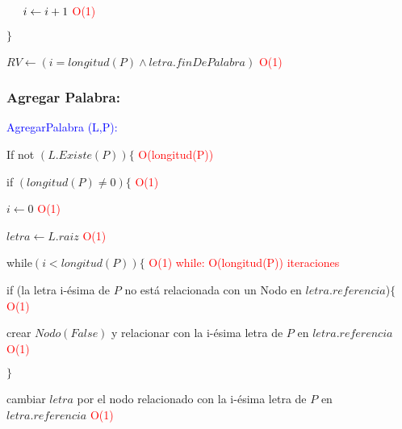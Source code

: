 \documentclass[a4paper]{article}
\begin{document}
$\hspace{0.5cm } i \leftarrow i+1 $\hspace{0.5cm} \textcolor{red}{O(1)}

$\}$

$ RV \leftarrow (i = longitud(P) \wedge letra.finDePalabra) $ \hspace{0.5cm} \textcolor{red}{O(1)}
	
   
\subsubsection*{Agregar Palabra:}
\textcolor{blue}{AgregarPalabra (L,P): }

If not $(L.Existe(P)) \{$ \hspace{0.5cm} \textcolor{red}{O(longitud(P))} 

\hspace{0.5cm} if $(longitud(P) \neq 0) \{$\hspace{0.5cm} \textcolor{red}{O(1)}

\hspace{1cm} $i\leftarrow 0$ \hspace{0.5cm} \textcolor{red}{O(1)}

\hspace{1cm} $letra \leftarrow L.raiz$ \hspace{0.5cm} \textcolor{red}{O(1)}

\hspace{1cm} while$(i<longitud(P))\{$ \hspace{0.5cm} \textcolor{red}{O(1)} \hspace{0.5cm} \textcolor{red}{while: O(longitud(P)) iteraciones} 

\hspace{1.5cm} if (la letra i-ésima de $P$ no está relacionada con un Nodo en $letra.referencia$)$\{$\hspace{0.5cm} \textcolor{red}{O(1)}

\hspace{2cm} crear $Nodo (False)$ y relacionar con la i-ésima letra de $P$ en $letra.referencia$\hspace{0.5cm} \textcolor{red}{O(1)} 

\hspace{1.5cm}$\}$
                        
\hspace{1.5cm}	cambiar $letra$ por el nodo relacionado con la i-ésima letra de $P$ en $letra.referencia$\hspace{0.5cm} \textcolor{red}{O(1)}
\end{document}
